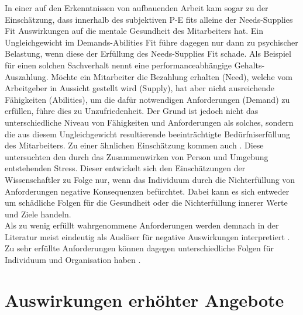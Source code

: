 In einer auf den Erkenntnissen von \textcite{copingAndAdaption:1974} aufbauenden Arbeit kam \textcite{harrison:1978} sogar zu der Einschätzung, dass innerhalb des subjektiven P-E fits alleine der Needs-Supplies Fit Auswirkungen auf die mentale Gesundheit des Mitarbeiters hat. Ein Ungleichgewicht im Demands-Abilities Fit führe dagegen nur dann zu psychischer Belastung, wenn diese der Erfüllung des Needs-Supplies Fit schade. Als Beispiel für einen solchen Sachverhalt nennt \textcite{harrison:1978} eine performanceabhängige Gehalts-Auszahlung. Möchte ein Mitarbeiter die Bezahlung erhalten (Need), welche vom Arbeitgeber in Aussicht gestellt wird (Supply), hat aber nicht ausreichende Fähigkeiten (Abilities), um die dafür notwendigen Anforderungen (Demand) zu erfüllen, führe dies zu Unzufriedenheit. Der Grund ist jedoch nicht das unterschiedliche Niveau von Fähigkeiten und Anforderungen als solches, sondern die aus diesem Ungleichgewicht resultierende beeinträchtigte Bedürfniserfüllung des Mitarbeiters. Zu einer ähnlichen Einschätzung kommen auch \textcite[S. 1ff.]{lazarus:1978}. Diese untersuchten den durch das Zusammenwirken von Person und Umgebung entstehenden Stress. Dieser entwickelt sich den Einschätzungen der Wissenschaftler zu Folge nur, wenn das Individuum durch die Nichterfüllung von Anforderungen negative Konsequenzen befürchtet. Dabei kann es sich entweder um schädliche Folgen für die Gesundheit oder die Nichterfüllung innerer Werte und Ziele handeln. \\
Als zu wenig erfüllt wahrgenommene Anforderungen werden demnach in der Literatur meist eindeutig als Auslöser für negative Auswirkungen interpretiert \cite[S. 5]{schuler:1980}. Zu sehr erfüllte Anforderungen können dagegen unterschiedliche Folgen für Individuum und Organisation haben \cite{harrison:1978}.

\section{Auswirkungen erhöhter Angebote}
\label{ch:personEnvironmentFit:auswirkungenErhoehterAngebote}


